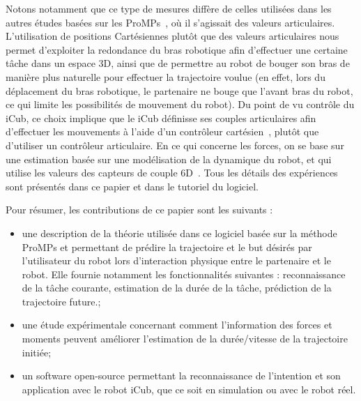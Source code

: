 \documentclass[utf8]{frontiersSCNS} %
\newcommand{\todo}[1]{\textcolor{red}{\textbf{/*#1*/}}}
\begin{document}
Notons notamment que ce type de mesures diffère de celles utilisées dans les autres études basées sur les ProMPs~\citep{paraschos2015model}, où il s'agissait des valeurs articulaires. L'utilisation de positions Cartésiennes plutôt que des valeurs articulaires nous permet d'exploiter la redondance du bras robotique afin d'effectuer une certaine tâche dans un espace 3D, ainsi que de permettre au robot de bouger son bras de manière plus naturelle pour effectuer la trajectoire voulue (en effet, lors du déplacement du bras robotique, le partenaire ne bouge que l'avant bras du robot, ce qui limite les possibilités de mouvement du robot).
Du point de vu contrôle du iCub, ce choix implique que le iCub définisse ses couples articulaires afin d'effectuer les mouvements à l'aide d'un contrôleur cartésien~\citep{pattacini2010experimental}, plutôt que d'utiliser un contrôleur articulaire. En ce qui concerne les forces, on se base sur une estimation basée sur une modélisation de la dynamique du robot, et qui utilise les valeurs des capteurs de couple 6D~\citep{ivaldi2011computing,fumagalli2012force}.
Tous les détails des expériences sont présentés dans ce papier et dans le tutoriel du logiciel.

Pour résumer, les contributions de ce papier sont les suivants :
\begin{itemize}
\item  une description de la théorie utilisée dans ce logiciel basée sur la méthode ProMPs et permettant de prédire la trajectoire et le but désirés par l'utilisateur du robot lors d'interaction physique entre le partenaire et le robot. Elle fournie notamment les fonctionnalités suivantes : reconnaissance de la tâche courante, estimation de la durée de la tâche, prédiction de la trajectoire future.;
\item une étude expérimentale concernant comment l'information des forces et moments peuvent améliorer l'estimation de la durée/vitesse de la trajectoire initiée;
\item un software open-source permettant la reconnaissance de l'intention et son application avec le robot iCub, que ce soit en simulation ou avec le robot réel.
\end{itemize}
\end{document}

